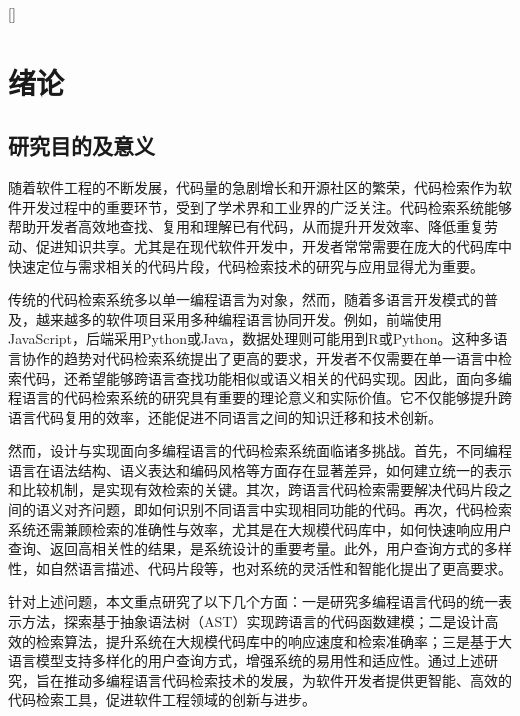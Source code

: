 \documentclass[UTF8,a4paper,12pt]{ctexart}
\numberwithin{equation}{section}
\renewcommand\thesection{\arabic{section}}
\begin{document}
\newpage
{}

\renewcommand\contentsname{{目\quad 录}}

\begin{center}
{\tableofcontents
\thispagestyle{fancy}
}
\end{center}



\newpage
{}


\titleformat{\section}{\heiti\zihao{3}\centering}{\thesection}{0.5em}{}[]
\section{绪论}
\subsection{研究目的及意义}
随着软件工程的不断发展，代码量的急剧增长和开源社区的繁荣，代码检索作为软件开发过程中的重要环节，受到了学术界和工业界的广泛关注。代码检索系统能够帮助开发者高效地查找、复用和理解已有代码，从而提升开发效率、降低重复劳动、促进知识共享。尤其是在现代软件开发中，开发者常常需要在庞大的代码库中快速定位与需求相关的代码片段，代码检索技术的研究与应用显得尤为重要。\par
传统的代码检索系统多以单一编程语言为对象，然而，随着多语言开发模式的普及，越来越多的软件项目采用多种编程语言协同开发。例如，前端使用JavaScript，后端采用Python或Java，数据处理则可能用到R或Python。这种多语言协作的趋势对代码检索系统提出了更高的要求，开发者不仅需要在单一语言中检索代码，还希望能够跨语言查找功能相似或语义相关的代码实现。因此，面向多编程语言的代码检索系统的研究具有重要的理论意义和实际价值。它不仅能够提升跨语言代码复用的效率，还能促进不同语言之间的知识迁移和技术创新。\par
然而，设计与实现面向多编程语言的代码检索系统面临诸多挑战。首先，不同编程语言在语法结构、语义表达和编码风格等方面存在显著差异，如何建立统一的表示和比较机制，是实现有效检索的关键。其次，跨语言代码检索需要解决代码片段之间的语义对齐问题，即如何识别不同语言中实现相同功能的代码。再次，代码检索系统还需兼顾检索的准确性与效率，尤其是在大规模代码库中，如何快速响应用户查询、返回高相关性的结果，是系统设计的重要考量。此外，用户查询方式的多样性，如自然语言描述、代码片段等，也对系统的灵活性和智能化提出了更高要求。\par
针对上述问题，本文重点研究了以下几个方面：一是研究多编程语言代码的统一表示方法，探索基于抽象语法树（AST）实现跨语言的代码函数建模；二是设计高效的检索算法，提升系统在大规模代码库中的响应速度和检索准确率；三是基于大语言模型支持多样化的用户查询方式，增强系统的易用性和适应性。通过上述研究，旨在推动多编程语言代码检索技术的发展，为软件开发者提供更智能、高效的代码检索工具，促进软件工程领域的创新与进步。\par
\end{document}
